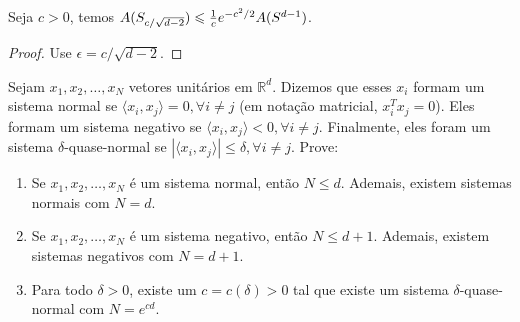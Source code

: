 \begin{lema}
Seja $c > 0$, temos $A(S_{c/\sqrt{d-2}}) \leqslant {1 \over c} e^{-c^2/2} A(S^{d-1})$.
\end{lema}

\begin{proof}
Use $\epsilon = c/\sqrt{d-2}$.
\end{proof}

\begin{exercicio}
Sejam $x_1, x_2, \dots, x_N$ vetores unitários em $\mathbb{R}^d$. Dizemos que esses $x_i$ formam um sistema normal se $\langle x_i, x_j \rangle = 0, \forall i \not = j$ (em notação matricial, $x_i^Tx_j = 0$). Eles formam um sistema negativo se $\langle x_i, x_j \rangle < 0, \forall i \not = j$. Finalmente, eles foram um sistema $\delta$-quase-normal se $| \langle x_i, x_j \rangle | \leqslant \delta, \forall i \not = j$. Prove:

\begin{enumerate}
\item Se $x_1, x_2, \dots, x_N$ é um sistema normal, então $N \leqslant d$. Ademais, existem sistemas normais com $N = d$.
\item Se $x_1, x_2, \dots, x_N$ é um sistema negativo, então $N \leqslant d+1$. Ademais, existem sistemas negativos com $N = d+1$.
\item Para todo $\delta > 0$, existe um $c = c(\delta) > 0$ tal que existe um sistema $\delta$-quase-normal com $N = e^{cd}$.
\end{enumerate}
\end{exercicio}

